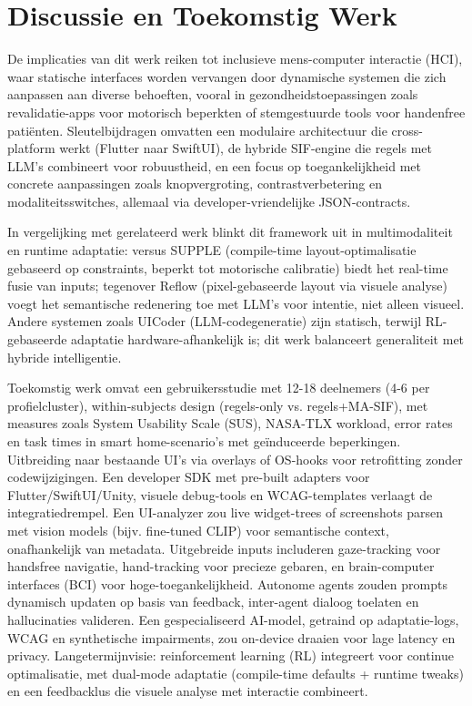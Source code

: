 \documentclass[openany]{book}
\begin{document}
\section*{Discussie en Toekomstig Werk}

De implicaties van dit werk reiken tot inclusieve mens-computer interactie (HCI), waar statische interfaces worden vervangen door dynamische systemen die zich aanpassen aan diverse behoeften, vooral in gezondheidstoepassingen zoals revalidatie-apps voor motorisch beperkten of stemgestuurde tools voor handenfree patiënten. Sleutelbijdragen omvatten een modulaire architectuur die cross-platform werkt (Flutter naar SwiftUI), de hybride SIF-engine die regels met LLM's combineert voor robuustheid, en een focus op toegankelijkheid met concrete aanpassingen zoals knopvergroting, contrastverbetering en modaliteitsswitches, allemaal via developer-vriendelijke JSON-contracts.

In vergelijking met gerelateerd werk blinkt dit framework uit in multimodaliteit en runtime adaptatie: versus SUPPLE (compile-time layout-optimalisatie gebaseerd op constraints, beperkt tot motorische calibratie) biedt het real-time fusie van inputs; tegenover Reflow (pixel-gebaseerde layout via visuele analyse) voegt het semantische redenering toe met LLM's voor intentie, niet alleen visueel. Andere systemen zoals UICoder (LLM-codegeneratie) zijn statisch, terwijl RL-gebaseerde adaptatie hardware-afhankelijk is; dit werk balanceert generaliteit met hybride intelligentie.

Toekomstig werk omvat een gebruikersstudie met 12-18 deelnemers (4-6 per profielcluster), within-subjects design (regels-only vs. regels+MA-SIF), met measures zoals System Usability Scale (SUS), NASA-TLX workload, error rates en task times in smart home-scenario's met geïnduceerde beperkingen. Uitbreiding naar bestaande UI's via overlays of OS-hooks voor retrofitting zonder codewijzigingen. Een developer SDK met pre-built adapters voor Flutter/SwiftUI/Unity, visuele debug-tools en WCAG-templates verlaagt de integratiedrempel. Een UI-analyzer zou live widget-trees of screenshots parsen met vision models (bijv. fine-tuned CLIP) voor semantische context, onafhankelijk van metadata. Uitgebreide inputs includeren gaze-tracking voor handsfree navigatie, hand-tracking voor precieze gebaren, en brain-computer interfaces (BCI) voor hoge-toegankelijkheid. Autonome agents zouden prompts dynamisch updaten op basis van feedback, inter-agent dialoog toelaten en hallucinaties valideren. Een gespecialiseerd AI-model, getraind op adaptatie-logs, WCAG en synthetische impairments, zou on-device draaien voor lage latency en privacy. Langetermijnvisie: reinforcement learning (RL) integreert voor continue optimalisatie, met dual-mode adaptatie (compile-time defaults + runtime tweaks) en een feedbacklus die visuele analyse met interactie combineert.
\end{document}
